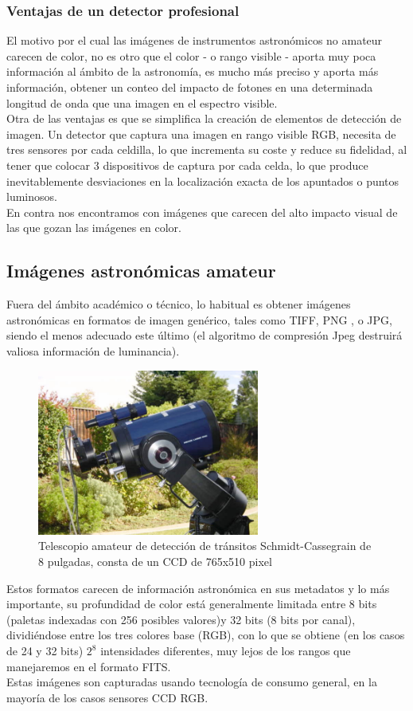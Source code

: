 	\subsubsection{Ventajas de un detector profesional}
	El motivo por el cual las imágenes de instrumentos astronómicos no amateur carecen de color, no es otro que el color - o rango visible - aporta muy poca información al ámbito de la astronomía, es mucho más preciso y aporta más información, obtener un conteo del impacto de fotones en una determinada longitud de onda que una imagen en el espectro visible.
	\\
	Otra de las ventajas es que se simplifica la creación de elementos de detección de imagen. Un detector que captura una imagen en rango visible RGB, necesita de tres sensores por cada celdilla, lo que incrementa su coste y reduce su fidelidad, al tener que colocar 3 dispositivos de captura por cada celda, lo que produce inevitablemente desviaciones en la localización exacta de los apuntados o puntos luminosos.
	\\
	En contra nos encontramos con imágenes que carecen del alto impacto visual de las que gozan las imágenes en color.

	\subsection{Imágenes astronómicas amateur}
	Fuera del ámbito académico o técnico, lo habitual es obtener imágenes astronómicas en formatos de imagen genérico, tales como TIFF, PNG , o JPG, siendo el menos adecuado este último (el algoritmo de compresión Jpeg destruirá valiosa información de luminancia).
	\begin{figure}[!h]
		\centering
		\includegraphics[width=0.65\textwidth]{images/amateur_transit_detection_Schmidt_Cassegrain_765_510pixCCD.jpg}
		\caption{\label{fig:Amateur Telescope}Telescopio amateur de detección de tránsitos Schmidt-Cassegrain de 8 pulgadas, consta de un CCD de 765x510 pixel}
	\end{figure}
	Estos formatos carecen de información astronómica en sus metadatos y lo más importante, su profundidad de color está generalmente limitada entre 8 bits (paletas indexadas con 256 posibles valores)y 32 bits (8 bits por canal), dividiéndose entre los tres colores base (RGB), con lo que se obtiene (en los casos de 24 y 32 bits) $ 2^8 $ intensidades diferentes, muy lejos de los rangos que manejaremos en el formato FITS.
	\\
	Estas imágenes son capturadas usando tecnología de consumo general, en la mayoría de los casos sensores CCD RGB.

